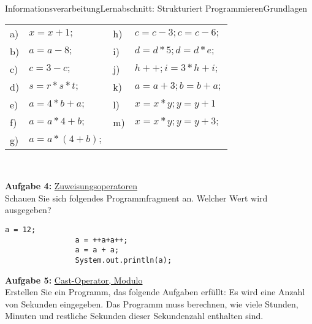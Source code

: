 \documentclass[oneside,openany,headings=optiontotoc,11pt,numbers=noenddot]{scrreprt}
\begin{document}
\begin{worksheet}{Informationsverarbeitung}{Lernabschnitt: Strukturiert Programmieren}{Grundlagen}
\begin{framed}
			\begin{tabularx}{\textwidth}{lXlX}
				a) & \(x = x + 1;\)  & h) & \(c = c-3; c = c-6;\)\\
				b) & \(a = a - 8;\) & i) & \(d = d*5; d = d*e;\)\\
				c) & \(c = 3 - c;\) & j) & \(h++; i = 3*h + i;\)\\
				d) & \(s = r*s*t;\) & k) & \(a = a+3; b = b + a;\)\\
				e) & \(a = 4 * b + a;\) & l) & \(x = x*y; y = y + 1\)\\
				f) & \(a = a*4 + b;\) & m) & \(x = x*y; y = y + 3;\)\\
				g) & \(a = a*(4+b);\)
			\end{tabularx}\\
			\par\noindent
			\textbf{Aufgabe 4:} \underline{Zuweisungsoperatoren}\\
			Schauen Sie sich folgendes Programmfragment an. Welcher Wert wird ausgegeben?
			\begin{lstlisting}[style=JavaInputStyle]
				a = 12;
				a = ++a+a++;
				a = a + a;
				System.out.println(a);
			\end{lstlisting}
			\par\noindent
			\textbf{Aufgabe 5:} \underline{Cast-Operator, Modulo}\\
			Erstellen Sie ein Programm, das folgende Aufgaben erfüllt: Es wird eine Anzahl von Sekunden eingegeben. Das Programm muss berechnen, wie viele Stunden, Minuten und restliche Sekunden dieser Sekundenzahl enthalten sind.
		\end{framed}
	\end{worksheet}
\end{document}
